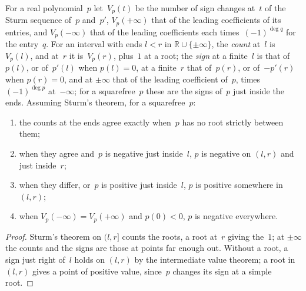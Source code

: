 \begin{lemma}\label{lem:sturmInterval}
  \leanok
  For a real polynomial~$p$ let~$V_p(t)$ be the number of sign changes at~$t$ of the Sturm sequence
  of~$p$ and~$p'$, $V_p(+\infty)$ that of the leading coefficients of its entries, and
  $V_p(-\infty)$ that of the leading coefficients each times~$(-1)^{\deg q}$ for the entry~$q$. For
  an interval with ends $l < r$ in $\mathbb{R} \cup \{\pm\infty\}$, the \emph{count} at~$l$
  is~$V_p(l)$, and at~$r$ it is~$V_p(r)$, plus~$1$ at a root; the \emph{sign} at a finite~$l$ is
  that of~$p(l)$, or of~$p'(l)$ when $p(l) = 0$, at a finite~$r$ that of~$p(r)$, or of~$-p'(r)$ when
  $p(r) = 0$, and at $\pm\infty$ that of the leading coefficient of~$p$, times~$(-1)^{\deg p}$
  at~$-\infty$; for a squarefree~$p$ these are the signs of~$p$ just inside the ends. Assuming
  Sturm's theorem, for a squarefree~$p$:
  \begin{enumerate}
    \item the counts at the ends agree exactly when~$p$ has no root strictly between them;
    \item when they agree and~$p$ is negative just inside~$l$, $p$ is negative on $(l, r)$ and just
      inside~$r$;
    \item when they differ, or~$p$ is positive just inside~$l$, $p$ is positive somewhere in
      $(l, r)$;
    \item when $V_p(-\infty) = V_p(+\infty)$ and $p(0) < 0$, $p$ is negative everywhere.
  \end{enumerate}
\end{lemma}

\begin{proof}
  \leanok
  Sturm's theorem on $(l, r]$ counts the roots, a root at~$r$ giving the~$1$; at $\pm\infty$ the
  counts and the signs are those at points far enough out. Without a root, a sign just right of~$l$
  holds on $(l, r)$ by the intermediate value theorem; a root in $(l, r)$ gives a point of positive
  value, since~$p$ changes its sign at a simple root.
\end{proof}


